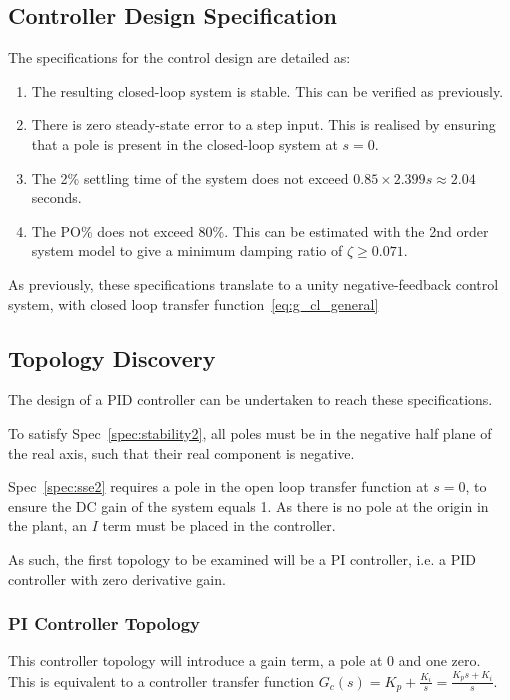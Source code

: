\documentclass[11pt,a4paper]{article}
\begin{document}
\subsection{Controller Design Specification}
The specifications for the control design are detailed as:
\begin{enumerate}[label=\roman*., ref=\thesubsection(\roman*)]
    \item 
    The resulting closed-loop system is stable. This can be verified as previously.
    \label{spec:stability2}
    \item 
    There is zero steady-state error to a step input. This is realised
    by ensuring that a pole is present in the closed-loop system at $s=0$.
    \label{spec:sse2}
    \item 
    The 2\% settling time of the system does not exceed $0.85\times 2.399s \approx 2.04$ seconds.
    \label{spec:settling2}
    \item 
    The PO\% does not exceed 80\%. This can be estimated with the 2nd order system model to give a minimum damping ratio of $\zeta\geq0.071$.
    \label{spec:overshoot2}
\end{enumerate}

As previously, these specifications translate to a unity negative-feedback control system, with closed loop transfer function~\eqref{eq:g_cl_general}
\subsection{Topology Discovery}
The design of a PID controller can be undertaken to reach these specifications. 

To satisfy Spec~\ref{spec:stability2}, all poles must be in the negative half plane of the real axis, such that their real component is negative. 

Spec~\ref{spec:sse2} requires a pole in the open loop transfer function at $s=0$, to ensure the DC gain of the system equals 1. As there is no pole at the origin in the plant, an $I$ term must be placed in the controller. 

As such, the first topology to be examined will be a PI controller, i.e. a PID controller with zero derivative gain.

\subsubsection{PI Controller Topology}

This controller topology will introduce a gain term, a pole at 0 and one zero. This is equivalent to a controller transfer function $G_c(s) = K_p + \frac{K_i}{s} = \frac{K_ps + K_i}{s}$. 
\end{document}
